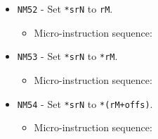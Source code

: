 \documentclass{article}
\def\specialtoaddr#1{\Verb|#1102| - output \Verb|sr#1| to addr bus}
\def\pkptrout{\Verb|0202| - output *\Verb|pk| to data bus}
\def\datatooffs{\Verb|4402| - write to \Verb|offs| from data bus}
\def\incrementpk{\Verb|0502| - increment \Verb|pk|}
\def\writeRAMo{\Verb|0104| - write data bus to *(addr bus+\Verb|offs|)}
\def\echodatalong{\Verb|0025| - echo data bus to itself for 3 cycles}
\def\done{\Verb|fffe| - end instruction}
\begin{document}
\begin{itemize}
    \item \Verb|NM52| - Set \Verb|*srN| to \Verb|rM|.
    \begin{itemize}
        \item Micro-instruction sequence:
    \end{itemize}
    
    \item \Verb|NM53| - Set \Verb|*srN| to \Verb|*rM|.
    \begin{itemize}
        \item Micro-instruction sequence:
    \end{itemize}
    
    \item \Verb|NM54| - Set \Verb|*srN| to \Verb|*(rM+offs)|.
    \begin{itemize}
        \item Micro-instruction sequence:
    \end{itemize}


\end{itemize}
\end{document}
